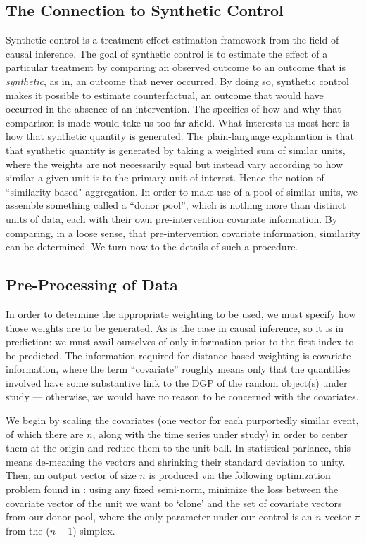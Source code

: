 \documentclass{uiucthesis2021}
\theoremstyle{definition}
\begin{document}
\subsection{The Connection to Synthetic Control}
Synthetic control \cite[][]{abadie2003economic,abadie2010synthetic} is a treatment effect estimation framework from the field of causal inference.  The goal of synthetic control is to estimate the effect of a particular treatment by comparing an observed outcome to an outcome that is \textit{synthetic}, as in, an outcome that never occurred.  By doing so, synthetic control makes it possible to estimate counterfactual, an outcome that would have occurred in the absence of an intervention.  The specifics of how and why that comparison is made would take us too far afield.  What interests us most here is how that synthetic quantity is generated.  The plain-language explanation is that that synthetic quantity is generated by taking a weighted sum of similar units, where the weights are not necessarily equal but instead vary according to how similar a given unit is to the primary unit of interest.  Hence the notion of ``similarity-based" aggregation.  In order to make use of a pool of similar units, we assemble something called a ``donor pool'', which is nothing more than distinct units of data, each with their own pre-intervention covariate information.  By comparing, in a loose sense, that pre-intervention covariate information, similarity can be determined.  We turn now to the details of such a procedure.

\subsection{Pre-Processing of Data}
In order to determine the appropriate weighting to be used, we must specify how those weights are to be generated.  As is the case in causal inference, so it is in prediction: we must avail ourselves of only information prior to the first index to be predicted.  The information required for distance-based weighting is covariate information, where the term ``covariate'' roughly means only that the quantities involved have some substantive link to the DGP of the random object(s) under study --- otherwise, we would have no reason to be concerned with the covariates.

We begin by scaling the covariates (one vector for each purportedly similar event, of which there are $n$, along with the time series under study) in order to center them at the origin and reduce them to the unit ball.  In statistical parlance, this means de-meaning the vectors and shrinking their standard deviation to unity.  Then, an output vector of size $n$ is produced via the following optimization problem found in  \cite[][]{abadie2003economic,abadie2010synthetic}: using any fixed semi-norm, minimize the loss between the covariate vector of the unit we want to `clone' and the set of covariate vectors from our donor pool, where the only parameter under our control is an $n$-vector $\pi$ from the ($n-1$)-simplex.  
\end{document}
